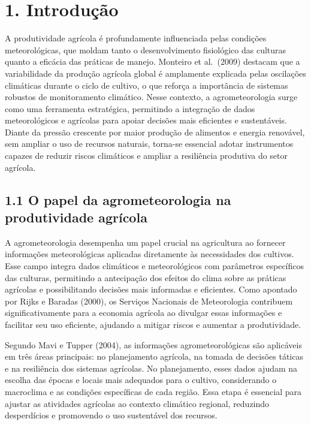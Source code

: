 \documentclass[
  brazilian,
  12pt,
  a4paper,
]{article}
\begin{document}
\section{\texorpdfstring{\textbf{1}.
Introdução}{1. Introdução}}\label{introduuxe7uxe3o}

A produtividade agrícola é profundamente influenciada pelas condições
meteorológicas, que moldam tanto o desenvolvimento fisiológico das
culturas quanto a eficácia das práticas de manejo. Monteiro et
al.~(2009) destacam que a variabilidade da produção agrícola global é
amplamente explicada pelas oscilações climáticas durante o ciclo de
cultivo, o que reforça a importância de sistemas robustos de
monitoramento climático. Nesse contexto, a agrometeorologia surge como
uma ferramenta estratégica, permitindo a integração de dados
meteorológicos e agrícolas para apoiar decisões mais eficientes e
sustentáveis. Diante da pressão crescente por maior produção de
alimentos e energia renovável, sem ampliar o uso de recursos naturais,
torna-se essencial adotar instrumentos capazes de reduzir riscos
climáticos e ampliar a resiliência produtiva do setor agrícola.

\subsection{\texorpdfstring{\textbf{1.1 O papel da agrometeorologia na
produtividade
agrícola}}{1.1 O papel da agrometeorologia na produtividade agrícola}}\label{o-papel-da-agrometeorologia-na-produtividade-agruxedcola}

A agrometeorologia desempenha um papel crucial na agricultura ao
fornecer informações meteorológicas aplicadas diretamente às
necessidades dos cultivos. Esse campo integra dados climáticos e
meteorológicos com parâmetros específicos das culturas, permitindo a
antecipação dos efeitos do clima sobre as práticas agrícolas e
possibilitando decisões mais informadas e eficientes. Como apontado por
Rijks e Baradas (2000), os Serviços Nacionais de Meteorologia contribuem
significativamente para a economia agrícola ao divulgar essas
informações e facilitar seu uso eficiente, ajudando a mitigar riscos e
aumentar a produtividade.

Segundo Mavi e Tupper (2004), as informações agrometeorológicas são
aplicáveis em três áreas principais: no planejamento agrícola, na tomada
de decisões táticas e na resiliência dos sistemas agrícolas. No
planejamento, esses dados ajudam na escolha das épocas e locais mais
adequados para o cultivo, considerando o macroclima e as condições
específicas de cada região. Essa etapa é essencial para ajustar as
atividades agrícolas ao contexto climático regional, reduzindo
desperdícios e promovendo o uso sustentável dos recursos.
\end{document}
